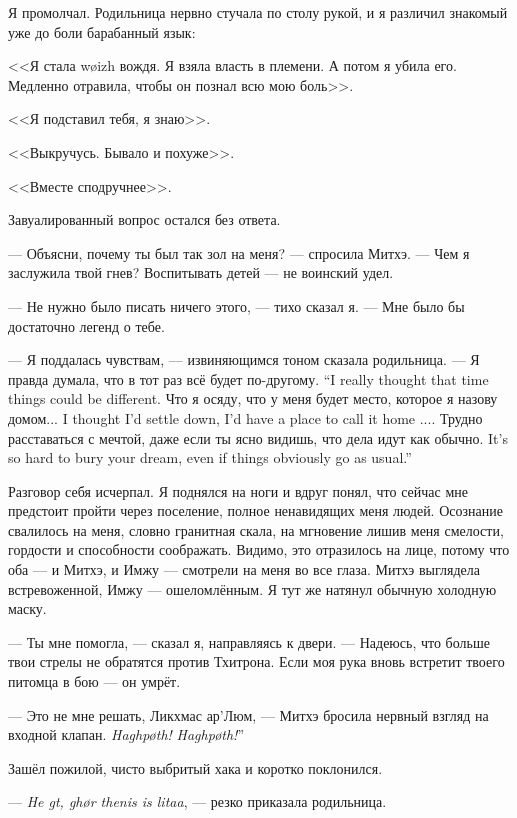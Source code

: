 Я промолчал.
Родильница нервно стучала по столу рукой, и я различил знакомый уже до боли барабанный язык:

<<Я стала w\o izh вождя.
Я взяла власть в племени.
А потом я убила его.
Медленно отравила, чтобы он познал всю мою боль>>.

<<Я подставил тебя, я знаю>>.

<<Выкручусь.
Бывало и похуже>>.

<<Вместе сподручнее>>.

Завуалированный вопрос остался без ответа.

--- Объясни, почему ты был так зол на меня? --- спросила Митхэ.
--- Чем я заслужила твой гнев?
Воспитывать детей --- не воинский удел.

--- Не нужно было писать ничего этого, --- тихо сказал я.
--- Мне было бы достаточно легенд о тебе.

--- Я поддалась чувствам, --- извиняющимся тоном сказала родильница.
{--- Я правда думала, что в тот раз всё будет по-другому.}
{``I really thought that time things could be different.}
{Что я осяду, что у меня будет место, которое я назову домом...}
{I thought I'd settle down, I'd have a place to call it home ....}
{Трудно расставаться с мечтой, даже если ты ясно видишь, что дела идут как обычно.}
{It's so hard to bury your dream, even if things obviously go as usual.''}

Разговор себя исчерпал.
Я поднялся на ноги и вдруг понял, что сейчас мне предстоит пройти через поселение, полное ненавидящих меня людей.
Осознание свалилось на меня, словно гранитная скала, на мгновение лишив меня смелости, гордости и способности соображать.
Видимо, это отразилось на лице, потому что оба --- и Митхэ, и Имжу --- смотрели на меня во все глаза.
Митхэ выглядела встревоженной, Имжу --- ошеломлённым.
Я тут же натянул обычную холодную маску.

--- Ты мне помогла, --- сказал я, направляясь к двери.
--- Надеюсь, что больше твои стрелы не обратятся против Тхитрона.
Если моя рука вновь встретит твоего питомца в бою --- он умрёт.

--- Это не мне решать, Ликхмас ар’Люм, --- Митхэ бросила нервный взгляд на входной клапан.
{\textit{Haghp\o{}th!}}
{\textit{Haghp\o{}th!}''}

Зашёл пожилой, чисто выбритый хака и коротко поклонился.

--- \textit{He gt, gh\o{}r thenis is litaa}, --- резко приказала родильница.

